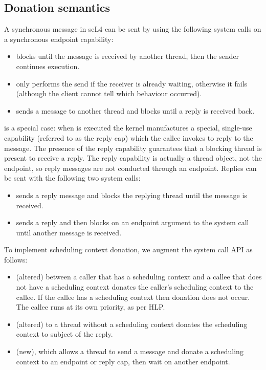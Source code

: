 \subsection{Donation semantics}

A synchronous message in seL4 can be sent by using the following system calls on a synchronous endpoint capability:

\begin{itemize}
	\item \send blocks until the message is received by another thread, then the sender continues execution.
	\item \nbsend only performs the send if the receiver is already waiting, otherwise it fails (although the client cannot tell which behaviour occurred).
	\item \call sends a message to another thread and blocks until a reply is received back.
\end{itemize}

\call is a special case: when \call is executed the kernel manufactures a special, single-use capability (referred to as the reply cap) which the callee invokes to reply to the message.
The presence of the reply capability guarantees that a blocking thread is present to receive a reply.
The reply capability is actually a thread object, not the endpoint, so reply messages are not conducted through an endpoint.
Replies can be sent with the following two system calls:

\begin{itemize}
	\item \reply sends a reply message and blocks the replying thread until the message is received.
	\item \replywait sends a reply and then blocks on an endpoint argument to the system call until another message is received.
\end{itemize}

To implement scheduling context donation, we augment the system call API as follows:

\begin{itemize}
	\item \call (altered) between a caller that has a scheduling context and a callee that does not
        have a scheduling context donates the caller's scheduling context to the callee. If the callee has a scheduling context then donation does not occur. The callee runs at its own priority, as per \gls{HLP}.
	\item \replywait (altered) to a thread without a scheduling context donates the scheduling context to subject of the reply.
    \item \sendwait (new), which allows a thread to send a message and donate a scheduling context to an endpoint or reply cap, then wait on another endpoint.
\end{itemize}

